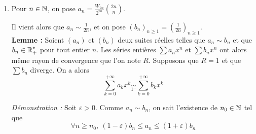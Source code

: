 \begin{solution}
\begin{enumerate}
		La série de fonctions $\displaystyle\sum f_n$ converge normalement, donc uniformément sur $\left[0,\frac\pi2\right]$. Il vient alors que 
		\[f(x)=\int_0^\frac\pi2\sum_{n=0}^{+\infty}f_n(t)\dd t = \sum_{n=0}^{+\infty}\int_0^\frac\pi2 f_n(t)\dd t \]

		Mézalor 
		\begin{align*}
			f(x) &= \sum_{n=0}^{+\infty}\int_0^\frac\pi2\frac{(2n)!}{2^{2n}(n!)^2}(x\sin t)^{2n}\dd t\\
				 &= \sum_{n=0}^{+\infty}\frac{(2n)!}{2^{2n}(n!)^2}x^{2n}\int_0^\frac\pi2\sin^{2n} t\dd t\\
				 &= \sum_{n=0}^{+\infty}\frac1{2^{2n}}W_{2n}\binom{2n}nx^{2n}
		\end{align*}

		Ceci valant pour tout $x\in(-1,1)$, on a que $f$ est égale à la somme d'une série entière sur un domaine non trivial, d'où que $f$ est dse${}_0$.

		\item Pour $n\in\operatorname{\mathbb N}$, on pose $a_n=\frac{W_{2n}}{2^{2n}}\binom{2n}n$.


		Il vient alors que $a_n\sim \frac1{2n}$, et on pose $(b_n)_{n\geq 1}=\left(\frac1{2n}\right)_{n\geq 1}$.\\


		\textbf{Lemme : } Soient $(a_n)$ et $(b_n)$ deux suites réelles telles que $a_n\sim b_n$ et que $b_n\in\operatorname{\mathbb R}_+^*$ pour tout entier $n$. Les séries entières $\displaystyle\sum a_nx^n$ et $\displaystyle\sum b_nx^n$ ont alors même rayon de convergence que l'on note $R$. Supposons que $R = 1$ et que $\displaystyle\sum b_n$ diverge. On a alors \[\sum_{k=0}^{+\infty}a_kx^k\underset{1^{-}}{\sim}\sum_{k=0}^{+\infty}b_kx^k\]


		\textit{Démonstration : } Soit $\varepsilon > 0$. Comme $a_n\sim b_n$, on sait l'existence de $n_0\in\operatorname{\mathbb N}$ tel que \[\forall n\geq n_0,\ (1-\varepsilon)b_n\leq a_n\leq (1+\varepsilon)b_n\]


\end{enumerate}
\end{solution}
